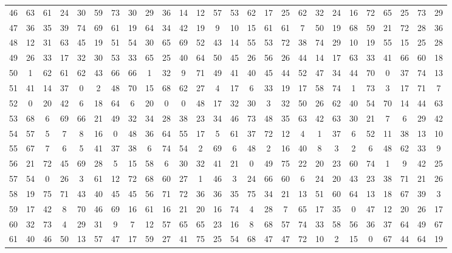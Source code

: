 \begin{table}
\begin{tabular}{c c c c c c c c c c c c c c c c c c c c c c c c c c }
46 & 63 & 61 & 24 & 30 & 59 & 73 & 30 & 29 & 36 & 14 & 12 & 57 & 53 & 62 & 17 & 25 & 62 & 32 & 24 & 16 & 72 & 65 & 25 & 73 & 29 \\
47 & 36 & 35 & 39 & 74 & 69 & 61 & 19 & 64 & 34 & 42 & 19 & 9 & 10 & 15 & 61 & 61 & 7 & 50 & 19 & 68 & 59 & 21 & 72 & 28 & 36 \\
48 & 12 & 31 & 63 & 45 & 19 & 51 & 54 & 30 & 65 & 69 & 52 & 43 & 14 & 55 & 53 & 72 & 38 & 74 & 29 & 10 & 19 & 55 & 15 & 25 & 28 \\
49 & 26 & 33 & 17 & 32 & 30 & 53 & 33 & 65 & 25 & 40 & 64 & 50 & 45 & 26 & 56 & 26 & 44 & 14 & 17 & 63 & 33 & 41 & 66 & 60 & 18 \\
50 & 1 & 62 & 61 & 62 & 43 & 66 & 66 & 1 & 32 & 9 & 71 & 49 & 41 & 40 & 45 & 44 & 52 & 47 & 34 & 44 & 70 & 0 & 37 & 74 & 13 \\
51 & 41 & 14 & 37 & 0 & 2 & 48 & 70 & 15 & 68 & 62 & 27 & 4 & 17 & 6 & 33 & 19 & 17 & 58 & 74 & 1 & 73 & 3 & 17 & 71 & 7 \\
52 & 0 & 20 & 42 & 6 & 18 & 64 & 6 & 20 & 0 & 0 & 48 & 17 & 32 & 30 & 3 & 32 & 50 & 26 & 62 & 40 & 54 & 70 & 14 & 44 & 63 \\
53 & 68 & 6 & 69 & 66 & 21 & 49 & 32 & 34 & 28 & 38 & 23 & 34 & 46 & 73 & 48 & 35 & 63 & 42 & 63 & 30 & 21 & 7 & 6 & 29 & 42 \\
54 & 57 & 5 & 7 & 8 & 16 & 0 & 48 & 36 & 64 & 55 & 17 & 5 & 61 & 37 & 72 & 12 & 4 & 1 & 37 & 6 & 52 & 11 & 38 & 13 & 10 \\
55 & 67 & 7 & 6 & 5 & 41 & 37 & 38 & 6 & 74 & 54 & 2 & 69 & 6 & 48 & 2 & 16 & 40 & 8 & 3 & 2 & 6 & 48 & 62 & 33 & 9 \\
56 & 21 & 72 & 45 & 69 & 28 & 5 & 15 & 58 & 6 & 30 & 32 & 41 & 21 & 0 & 49 & 75 & 22 & 20 & 23 & 60 & 74 & 1 & 9 & 42 & 25 \\
57 & 54 & 0 & 26 & 3 & 61 & 12 & 72 & 68 & 60 & 27 & 1 & 46 & 3 & 24 & 66 & 60 & 6 & 24 & 20 & 43 & 23 & 38 & 71 & 21 & 26 \\
58 & 19 & 75 & 71 & 43 & 40 & 45 & 45 & 56 & 71 & 72 & 36 & 36 & 35 & 75 & 34 & 21 & 13 & 51 & 60 & 64 & 13 & 18 & 67 & 39 & 3 \\
59 & 17 & 42 & 8 & 70 & 46 & 69 & 16 & 61 & 16 & 21 & 20 & 16 & 74 & 4 & 28 & 7 & 65 & 17 & 35 & 0 & 47 & 12 & 20 & 26 & 17 \\
60 & 32 & 73 & 4 & 29 & 31 & 9 & 7 & 12 & 57 & 65 & 65 & 23 & 16 & 8 & 68 & 57 & 74 & 33 & 58 & 56 & 36 & 37 & 64 & 49 & 67 \\
61 & 40 & 46 & 50 & 13 & 57 & 47 & 17 & 59 & 27 & 41 & 75 & 25 & 54 & 68 & 47 & 47 & 72 & 10 & 2 & 15 & 0 & 67 & 44 & 64 & 19 \\

\end{tabular}
\end{table}
